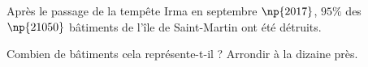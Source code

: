 \begin{exo}{}
	Après le passage de la tempête Irma en septembre $\np{2017}$, $95\%$ des $\np{21050}$ bâtiments de l'île de Saint-Martin ont été détruits.


	Combien de bâtiments cela représente-t-il ? Arrondir à la dizaine près.
\end{exo}
